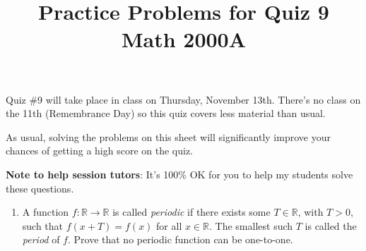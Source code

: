 \documentclass[letterpaper,12pt]{article}
\title{Practice Problems for Quiz 9\\Math 2000A}
\date{}
\newcommand{\R}{\mathbb{R}}
\begin{document}
 \maketitle
\vspace{-0.5in}

Quiz \#9 will take place in class on Thursday, November 13th. There's no class on the 11th (Remembrance Day) so this quiz covers less material than usual. 

As usual, solving the problems on this sheet will significantly improve your chances of getting a high score on the quiz.

{\bf Note to help session tutors}: It's 100\% OK for you to help my students solve these questions.
\begin{enumerate}
\item A function $f:\R\to\R$ is called {\em periodic} if there exists some $T\in\R$, with $T>0$, such that $f(x+T)=f(x)$ for all $x\in\R$. The smallest such $T$ is called the {\em period} of $f$. Prove that no periodic function can be one-to-one.


\end{enumerate}
\end{document}
